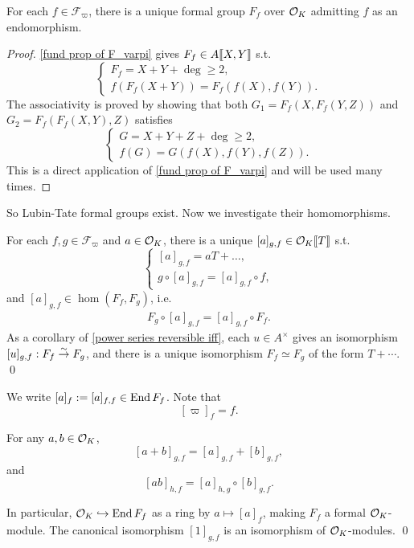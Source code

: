 \begin{proposition}
    For each $f\in \mathcal{F}_\varpi$, there is a unique formal group $F_f$ over $\mathcal{O}_K$ admitting $f$ as an endomorphism.
\end{proposition}
\begin{proof}
    \cref{fund prop of F_varpi} gives $F_f\in A\llbracket X, Y \rrbracket$ s.t. \[\begin{cases}
        F_f = X + Y + \deg \ge 2,\\
        f(F_f(X+Y)) = F_f(f(X), f(Y)).
    \end{cases}\]
    The associativity is proved by showing that both $G_1 = F_f(X, F_f(Y, Z))$ and $G_2 = F_f(F_f(X, Y), Z)$ satisfies 
    \[\begin{cases}
        G = X+Y+Z + \deg\ge 2,\\
        f(G) = G(f(X), f(Y), f(Z)).
    \end{cases}\]
    This is a direct application of \cref{fund prop of F_varpi} and will be used many times.
\end{proof}

So Lubin-Tate formal groups exist. Now we investigate their homomorphisms.
\begin{proposition}
    For each $f, g\in\mathcal{F}_\varpi$ and $a\in \mathcal{O}_K$, there is a unique $[a]_{g, f}\in \mathcal{O}_K\llbracket T \rrbracket$ s.t. \[\begin{cases}
        [a]_{g, f} = aT + \dots,\\
        g\circ [a]_{g, f} = [a]_{g, f} \circ f,
    \end{cases}\]and $[a]_{g, f}\in\hom(F_f, F_g)$, i.e. \begin{align*} F_g\circ [a]_{g, f} = [a]_{g, f}\circ F_f.\end{align*}
    As a corollary of \cref{power series reversible iff}, each $u\in A^\times$ gives an isomorphism $[u]_{g, f} : F_f\stackrel{\sim}{\rightarrow} F_g$, and there is a unique isomorphism $F_f\simeq F_g$ of the form $T + \cdots$.
    \qed
\end{proposition}

We write $[a]_{f} := [a]_{f, f}\in\operatorname{End} F_f$.
Note that \[[\varpi]_f = f.\]

\begin{proposition}
    For any $a, b\in\mathcal{O}_K$, \[[a+b]_{g, f} = [a]_{g, f} + [b]_{g, f},\]and\[[ab]_{h, f} = [a]_{h, g}\circ [b]_{g, f}.\]
    
    In particular, $\mathcal{O}_K\hookrightarrow\operatorname{End}  F_f$ as a ring by $a\mapsto [a]_f$, making $F_f$ a formal $\mathcal{O}_K$-module. The canonical isomorphism $[1]_{g, f}$ is an isomorphism of $\mathcal{O}_K$-modules.
    \qed
\end{proposition}

